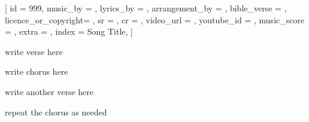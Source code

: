 [
    id                  = {999},
    music_by            = {}, %
    lyrics_by           = {}, %
    arrangement_by      = {}, %
    bible_verse         = {},
    licence_or_copyright= {},
    sr                  = {},
    cr                  = {},
    video_url           = {}, %
    youtube_id          = {}, %
    music_score         = {}, %
    extra               = {},
    index               = {Song Title},
]

\beginverse
write verse here
\endverse

\beginchorus
write chorus here
\endchorus

\beginverse
write another verse here
\endverse

\beginchorus
repeat the chorus as needed
\endchorus

\endsong
